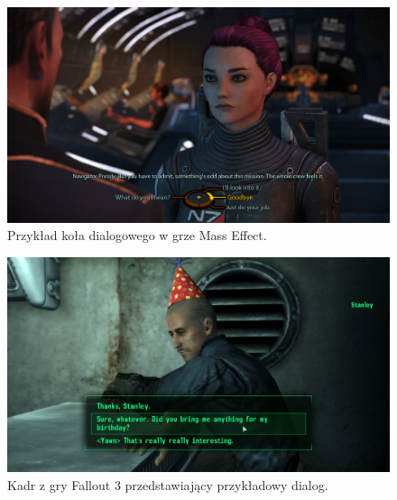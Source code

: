 \begin{figure}[h]
\centering
\includegraphics[width=1\textwidth]{images/me}
\caption{Przykład koła dialogowego w grze Mass Effect.}
\label{fig:wheel}
\end{figure}

\begin{figure}[h]
\centering
\includegraphics[width=1\textwidth]{images/fallout3}
\caption{Kadr z gry Fallout 3 przedstawiający przykładowy dialog.}
\label{fig:fallout}
\end{figure}

